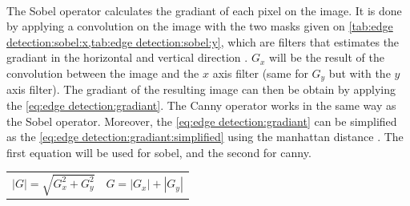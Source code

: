 

~~ 

The Sobel operator calculates the gradiant of each pixel on the image. It is done by applying a convolution on the image with the two masks given on \vref{tab:edge detection:sobel:x,tab:edge detection:sobel:y}, which are filters that estimates the gradiant in the horizontal and vertical direction  \cite{bib:filter:sobelRuby}. $G_x$ will be the result of the convolution between the image and the $x$ axis filter (same for $G_y$ but with the $y$ axis filter). The gradiant of the resulting image can then be obtain by applying the \vref{eq:edge detection:gradiant}. The Canny operator works in the same way as the Sobel operator. Moreover, the \vref{eq:edge detection:gradiant} can be simplified as the \vref{eq:edge detection:gradiant:simplified} using the manhattan distance \cite{bib:filter:canny}. The first equation will be used for sobel, and the second for canny. 


\noindent\begin{tabularx}{\textwidth}{@{}XX@{}}
	\begin{equation} \label{eq:edge detection:gradiant}
		|G| = \sqrt{G_{x}^2 + G_{y}^2}
	\end{equation} & 
	\begin{equation} \label{eq:edge detection:gradiant:simplified}
		G = |G_x| + |G_y|
	\end{equation}
\end{tabularx}





